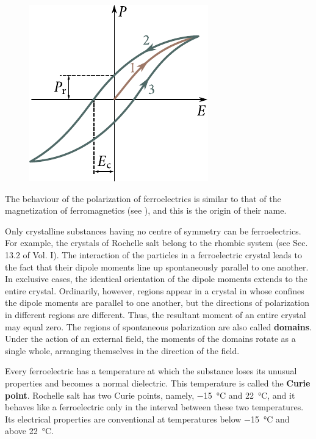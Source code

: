 \begin{figure}[t]
    \begin{center}
		\includegraphics[scale=1.0]{figures/ch_02/fig_2_13.pdf}
		\caption[]{}
		\label{fig:2_13}
	\end{center}
    \vspace{-0.8cm}
\end{figure}

The behaviour of the polarization of ferroelectrics is similar to that of the magnetization of ferromagnetics (see ), and this is the origin of their name.

Only crystalline substances having no centre of symmetry can be ferroelectrics. For example, the crystals of Rochelle salt belong to the rhombic system (see Sec. 13.2 of Vol. I). The interaction of the particles in a ferroelectric crystal leads to the fact that their dipole moments line up spontaneously parallel to one another. In exclusive cases, the identical orientation of the dipole moments extends to the entire crystal. Ordinarily, however, regions appear in a crystal in whose confines the dipole moments are parallel to one another, but the directions of polarization in different regions are different. Thus, the resultant moment of an entire crystal may equal zero. The regions of spontaneous polarization are also called \textbf{domains}. Under the action of an external field, the moments of the domains rotate as a single whole, arranging themselves in the direction of the field.

Every ferroelectric has a temperature at which the substance loses its unusual properties and becomes a normal dielectric. This temperature is called the \textbf{Curie point}. Rochelle salt has two Curie points, namely, \SI{-15}{\degreeCelsius} and \SI{+22}{\degreeCelsius}, and it behaves like a ferroelectric only in the interval between these two temperatures. Its electrical properties are conventional at temperatures below \SI{-15}{\degreeCelsius} and above \SI{+22}{\degreeCelsius}.
